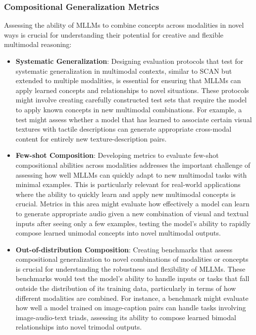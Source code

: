 \subsubsection{Compositional Generalization Metrics}
Assessing the ability of MLLMs to combine concepts across modalities in novel ways is crucial for understanding their potential for creative and flexible multimodal reasoning:

\begin{itemize}
    \item \textbf{Systematic Generalization}: Designing evaluation protocols that test for systematic generalization in multimodal contexts, similar to SCAN \citep{lake2018generalization} but extended to multiple modalities, is essential for ensuring that MLLMs can apply learned concepts and relationships to novel situations. These protocols might involve creating carefully constructed test sets that require the model to apply known concepts in new multimodal combinations. For example, a test might assess whether a model that has learned to associate certain visual textures with tactile descriptions can generate appropriate cross-modal content for entirely new texture-description pairs.

    \item \textbf{Few-shot Composition}: Developing metrics to evaluate few-shot compositional abilities across modalities addresses the important challenge of assessing how well MLLMs can quickly adapt to new multimodal tasks with minimal examples. This is particularly relevant for real-world applications where the ability to quickly learn and apply new multimodal concepts is crucial. Metrics in this area might evaluate how effectively a model can learn to generate appropriate audio given a new combination of visual and textual inputs after seeing only a few examples, testing the model's ability to rapidly compose learned unimodal concepts into novel multimodal outputs.

    \item \textbf{Out-of-distribution Composition}: Creating benchmarks that assess compositional generalization to novel combinations of modalities or concepts is crucial for understanding the robustness and flexibility of MLLMs. These benchmarks would test the model's ability to handle inputs or tasks that fall outside the distribution of its training data, particularly in terms of how different modalities are combined. For instance, a benchmark might evaluate how well a model trained on image-caption pairs can handle tasks involving image-audio-text triads, assessing its ability to compose learned bimodal relationships into novel trimodal outputs.
\end{itemize}

